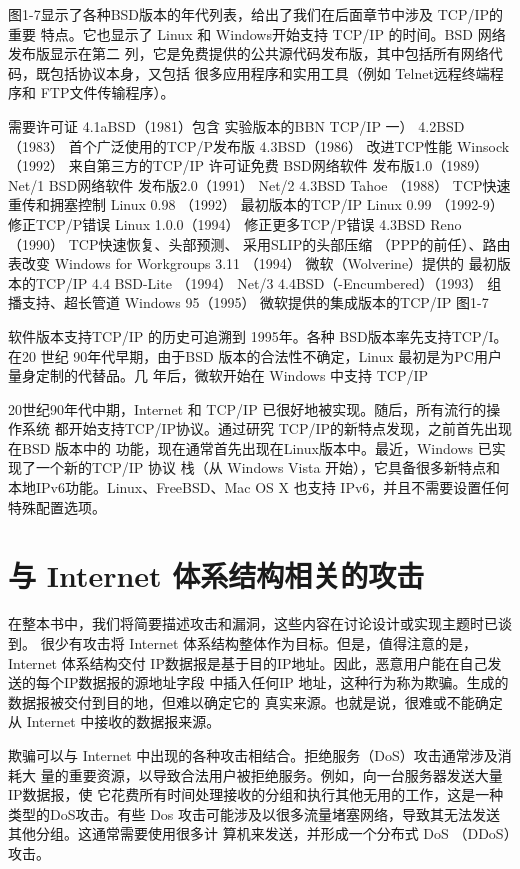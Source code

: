 图1-7显示了各种BSD版本的年代列表，给出了我们在后面章节中涉及 TCP/IP的重要
特点。它也显示了 Linux 和 Windows开始支持 TCP/IP 的时间。BSD 网络发布版显示在第二
列，它是免费提供的公共源代码发布版，其中包括所有网络代码，既包括协议本身，又包括
很多应用程序和实用工具（例如 Telnet远程终端程序和 FTP文件传输程序）。

需要许可证
4.1aBSD（1981）包含
实验版本的BBN TCP/IP
一）
4.2BSD （1983）
首个广泛使用的TCP/P发布版
4.3BSD（1986）
改进TCP性能
Winsock（1992）
来自第三方的TCP/IP
许可证免费
BSD网络软件
发布版1.0（1989）
Net/1
BSD网络软件
发布版2.0（1991）
Net/2
4.3BSD Tahoe （1988）
TCP快速重传和拥塞控制
Linux 0.98 （1992）
最初版本的TCP/IP
Linux 0.99 （1992-9）
修正TCP/P错误
Linux 1.0.0（1994）
修正更多TCP/P错误
4.3BSD Reno（1990）
TCP快速恢复、头部预测、
采用SLIP的头部压缩
（PPP的前任）、路由表改变
Windows for Workgroups 3.11 （1994）
微软（Wolverine）提供的
最初版本的TCP/IP
4.4 BSD-Lite （1994）
Net/3
4.4BSD（-Encumbered）（1993）
组播支持、超长管道
Windows 95（1995）
微软提供的集成版本的TCP/IP
图1-7

软件版本支持TCP/IP 的历史可追溯到 1995年。各种 BSD版本率先支持TCP/I。在20 世纪
90年代早期，由于BSD 版本的合法性不确定，Linux 最初是为PC用户量身定制的代替品。几
年后，微软开始在 Windows 中支持 TCP/IP

20世纪90年代中期，Internet 和 TCP/IP 已很好地被实现。随后，所有流行的操作系统
都开始支持TCP/IP协议。通过研究 TCP/IP的新特点发现，之前首先出现在BSD 版本中的
功能，现在通常首先出现在Linux版本中。最近，Windows 已实现了一个新的TCP/IP 协议
栈（从 Windows Vista 开始），它具备很多新特点和本地IPv6功能。Linux、FreeBSD、Mac
OS X 也支持 IPv6，并且不需要设置任何特殊配置选项。

\section{与 Internet 体系结构相关的攻击}
在整本书中，我们将简要描述攻击和漏洞，这些内容在讨论设计或实现主题时已谈到。
很少有攻击将 Internet 体系结构整体作为目标。但是，值得注意的是，Internet 体系结构交付
IP数据报是基于目的IP地址。因此，恶意用户能在自己发送的每个IP数据报的源地址字段
中插入任何IP 地址，这种行为称为欺骗。生成的数据报被交付到目的地，但难以确定它的
真实来源。也就是说，很难或不能确定从 Internet 中接收的数据报来源。

欺骗可以与 Internet 中出现的各种攻击相结合。拒绝服务（DoS）攻击通常涉及消耗大
量的重要资源，以导致合法用户被拒绝服务。例如，向一台服务器发送大量IP数据报，使
它花费所有时间处理接收的分组和执行其他无用的工作，这是一种类型的DoS攻击。有些
Dos 攻击可能涉及以很多流量堵塞网络，导致其无法发送其他分组。这通常需要使用很多计
算机来发送，并形成一个分布式 DoS （DDoS）攻击。

